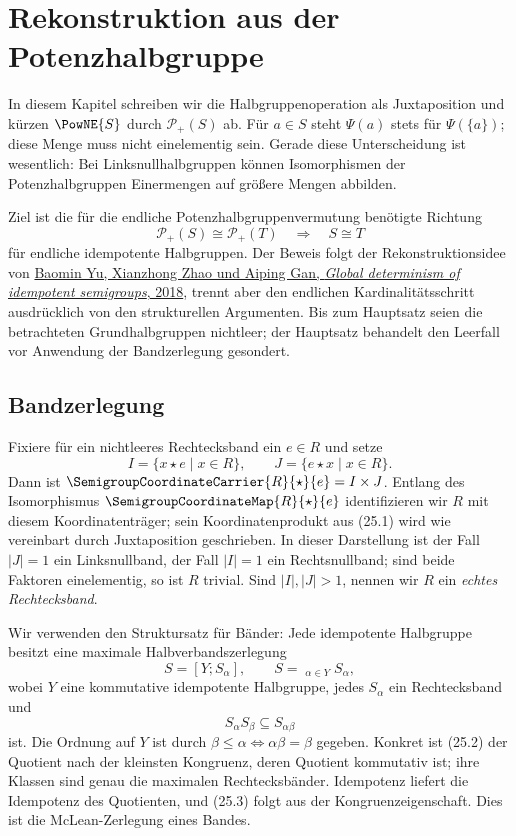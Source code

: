 \documentclass[main.tex]{subfiles}
\begin{document}
\chapter{Rekonstruktion aus der Potenzhalbgruppe}

In diesem Kapitel schreiben wir die Halbgruppenoperation als Juxtaposition
und kürzen \(\PowNE{S}\) durch \(\mathcal P_+(S)\) ab.  Für
\(a\in S\) steht \(\Psi(a)\) stets für \(\Psi(\{a\})\); diese Menge
muss nicht einelementig sein.  Gerade diese Unterscheidung ist wesentlich:
Bei Linksnullhalbgruppen können Isomorphismen der Potenzhalbgruppen
Einermengen auf größere Mengen abbilden.

Ziel ist die für die endliche Potenzhalbgruppenvermutung benötigte
Richtung
\[
  \mathcal P_+(S)\cong\mathcal P_+(T)
  \quad\Longrightarrow\quad S\cong T
\]
für endliche idempotente Halbgruppen.  Der Beweis folgt der
Rekonstruktionsidee von
\href{https://doi.org/10.1080/00927872.2017.1319474}%
  {Baomin Yu, Xianzhong Zhao und Aiping Gan,
  \emph{Global determinism of idempotent semigroups}, 2018},
trennt aber den endlichen Kardinalitätsschritt ausdrücklich von den
strukturellen Argumenten.
Bis zum Hauptsatz seien die betrachteten Grundhalbgruppen nichtleer; der
Hauptsatz behandelt den Leerfall vor Anwendung der Bandzerlegung gesondert.

\section{Bandzerlegung}

Fixiere f\"ur ein nichtleeres Rechtecksband ein \(e\in R\) und setze
\[
 I=\{x\star e\mid x\in R\},\qquad
 J=\{e\star x\mid x\in R\}.
\]
Dann ist \(\SemigroupCoordinateCarrier{R}{\star}{e}=I\times J\).
Entlang des Isomorphismus
\(\SemigroupCoordinateMap{R}{\star}{e}\) identifizieren wir \(R\) mit
diesem Koordinatentr\"ager; sein Koordinatenprodukt aus (25.1) wird wie
vereinbart durch Juxtaposition geschrieben.  In dieser Darstellung ist der Fall
\(|J|=1\) ein
Linksnullband, der Fall \(|I|=1\) ein Rechtsnullband; sind beide Faktoren
einelementig, so ist \(R\) trivial.  Sind \(|I|,|J|>1\), nennen wir
\(R\) ein \emph{echtes Rechtecksband}.

Wir verwenden den Struktursatz für Bänder: Jede idempotente Halbgruppe
besitzt eine maximale Halbverbandszerlegung
\[
  S=[Y;S_\alpha],\qquad
  S=\mathop{\dot\bigcup}_{\alpha\in Y}S_\alpha,           \tag{25.2}
\]
wobei \(Y\) eine kommutative idempotente Halbgruppe, jedes
\(S_\alpha\) ein Rechtecksband und
\[
  S_\alpha S_\beta\subseteq S_{\alpha\beta}              \tag{25.3}
\]
ist.  Die Ordnung auf \(Y\) ist durch
\(\beta\leq\alpha\iff\alpha\beta=\beta\) gegeben.
Konkret ist (25.2) der Quotient nach der kleinsten Kongruenz, deren
Quotient kommutativ ist; ihre Klassen sind genau die maximalen
Rechtecksbänder.  Idempotenz liefert die Idempotenz des Quotienten,
und (25.3) folgt aus der Kongruenzeigenschaft.  Dies ist die
McLean-Zerlegung eines Bandes.
\end{document}
